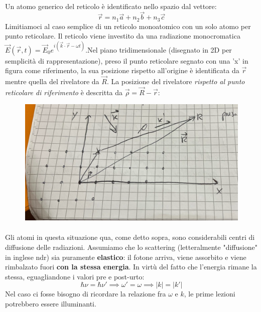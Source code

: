 \documentclass{book}
\begin{document}
            \paragraph{}
                Un atomo generico del reticolo è identificato nello spazio dal vettore:
                $$\vec{r} = n_{1}\vec{a}+n_{2}\vec{b}+n_{3}\vec{c}$$
                Limitiamoci al caso semplice di un reticolo monoatomico con un solo atomo per punto reticolare. Il reticolo viene investito da una radiazione monocromatica $\vec{E}(\vec{r},t) = \vec{E}_{0}e^{i(\vec{k}\cdot \vec{r}-\omega t)}$.Nel piano tridimensionale (disegnato in 2D per semplicità di rappresentazione), preso il punto reticolare segnato con una 'x' in figura come riferimento, la sua posizione rispetto all'origine è identificata da $\vec{r}$ mentre quella del rivelatore da $\vec{R}$. La posizione del rivelatore \textit{rispetto al punto reticolare di riferimento} è descritta da $\vec{\rho} = \vec{R}- \vec{r}$:
                \begin{figure}[h!]
                    \centering
                    \includegraphics[width=0.85\linewidth]{img/scatteringLez8.png}
                \end{figure}

                \paragraph{}
                    Gli atomi in questa situazione qua, come detto sopra, sono considerabili centri di diffusione delle radiazioni. Assumiamo che lo scattering (letteralmente "diffusione" in inglese ndr) sia puramente \textbf{elastico}: il fotone arriva, viene assorbito e viene rimbalzato fuori \textbf{con la stessa energia}. In virtù del fatto che l'energia rimane la stessa, eguagliandone i valori pre e post-urto:
                    $$\hbar \nu = \hbar \nu ' \implies \omega ' = \omega \implies |k| = |k'|$$
                    Nel caso ci fosse bisogno di ricordare la relazione fra $\omega$ e $k$, le prime lezioni potrebbero essere illuminanti.
\end{document}
